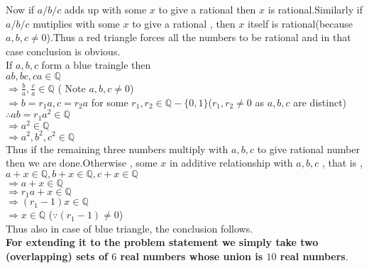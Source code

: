 \documentclass[a4paper,10pt]{article}
\begin{document}
Now if $a/b/c$ adds up with some $x$ to give a rational then $x$ is rational.Similarly if $a/b/c$ mutiplies with some $x$ to give a 
rational , then $x$ itself is rational(because $a,b,c \neq 0$).Thus a red triangle forces all the numbers to be rational and in that case
conclusion is obvious.\\
If $a,b,c$ form a blue traingle then \\
$ab,bc,ca \in \mathbb{Q} $\\
$\Rightarrow \frac{b}{a}, \frac{c}{a} \in \mathbb{Q} $ ( Note $a,b,c \neq 0$)\\
$\Rightarrow b=r_{1}a,c=r_{2}a$ for some $r_{1},r_{2} \in \mathbb{Q}  -\{0,1\}$($r_{1},r_{2} \neq 0$ as $a,b,c$ are distinct)\\
$\therefore ab=r_{1}a^2 \in \mathbb{Q} $\\
$\Rightarrow a^2 \in \mathbb{Q} $\\
$\Rightarrow a^2,b^2,c^2 \in \mathbb{Q} $\\
Thus if the remaining three numbers multiply with $a,b,c$ to give rational number then we are done.Otherwise , some $x$ in additive relationship with 
$a,b,c$ , that is , $a+x \in \mathbb{Q} ,b+x \in \mathbb{Q}  , c+x \in \mathbb{Q} $\\
$\Rightarrow a+x \in \mathbb{Q} $\\
$\Rightarrow r_{1}a+x \in \mathbb{Q}  $ \\
$\Rightarrow (r_{1}-1)x \in \mathbb{Q}  $\\
$\Rightarrow x\in \mathbb{Q} $ ($\because (r_{1}-1) \neq 0 $)\\
Thus also in case of blue triangle, the conclusion follows.\\

\textbf{For extending it to the problem statement we simply take two (overlapping) sets of $6$ real numbers whose union is $10$ real numbers}. 


    
\end{document}
